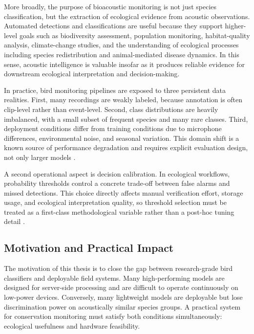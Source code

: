 \documentclass[a4paper,singleside,12pt]{report} %
\begin{document}
More broadly, the purpose of bioacoustic monitoring is not just species classification, but the extraction of ecological evidence from acoustic observations. Automated detections and classifications are useful because they support higher-level goals such as biodiversity assessment, population monitoring, habitat-quality analysis, climate-change studies, and the understanding of ecological processes including species redistribution and animal-mediated disease dynamics. In this sense, acoustic intelligence is valuable insofar as it produces reliable evidence for downstream ecological interpretation and decision-making.

In practice, bird monitoring pipelines are exposed to three persistent data realities. First, many recordings are weakly labeled, because annotation is often clip-level rather than event-level. Second, class distributions are heavily imbalanced, with a small subset of frequent species and many rare classes. Third, deployment conditions differ from training conditions due to microphone differences, environmental noise, and seasonal variation. This domain shift is a known source of performance degradation and requires explicit evaluation design, not only larger models \cite{stowell2019birdaudiodetection,birdnet2021,sheikh2024birdwhisperer}.

A second operational aspect is decision calibration. In ecological workflows, probability thresholds control a concrete trade-off between false alarms and missed detections. This choice directly affects manual verification effort, storage usage, and ecological interpretation quality, so threshold selection must be treated as a first-class methodological variable rather than a post-hoc tuning detail \cite{perezgranados2023birdnet,stowell2019birdaudiodetection}.


	\subsection{Motivation and Practical Impact}
The motivation of this thesis is to close the gap between research-grade bird classifiers and deployable field systems. Many high-performing models are designed for server-side processing and are difficult to operate continuously on low-power devices. Conversely, many lightweight models are deployable but lose discrimination power on acoustically similar species groups. A practical system for conservation monitoring must satisfy both conditions simultaneously: ecological usefulness and hardware feasibility.
\end{document}
